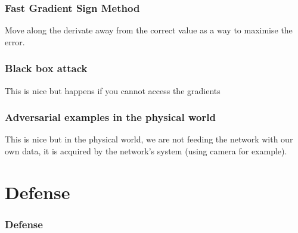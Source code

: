 \documentclass[9pt]{beamer}
\begin{document}
\begin{frame}
  \frametitle{Fast Gradient Sign Method}

  Move along the derivate away from the correct value as a way to
  maximise the error.
\end{frame}

\begin{frame}
  \frametitle{Black box attack}

  This is nice but happens if you cannot access the gradients

\end{frame}

\begin{frame}
  \frametitle{Adversarial examples in the physical world}

  This is nice but in the physical world, we are not feeding the
  network with our own data, it is acquired by the network's system
  (using camera for example).

\end{frame}

\section{Defense}

\begin{frame}
  \frametitle{Defense}
\end{frame}
\end{document}
